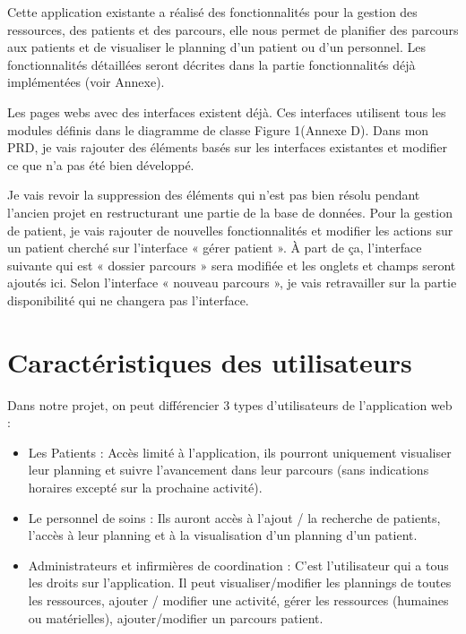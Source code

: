 \documentclass{polytech/polytech}
\begin{document}
Cette application existante a réalisé des fonctionnalités pour la gestion des ressources, des patients et des parcours, elle nous permet de planifier des parcours aux patients et de visualiser le planning d'un patient ou d'un personnel. Les fonctionnalités détaillées seront décrites dans la partie fonctionnalités déjà implémentées (voir Annexe).

Les pages webs avec des interfaces existent déjà. Ces interfaces utilisent tous les modules définis dans le diagramme de classe Figure 1(Annexe D). Dans mon PRD, je vais rajouter des éléments basés sur les interfaces existantes et modifier ce que n’a pas été bien développé. 

Je vais revoir la suppression des éléments qui n'est pas bien résolu pendant l'ancien projet en restructurant une partie de la base de données. Pour la gestion de patient, je vais rajouter de nouvelles fonctionnalités et modifier les actions sur un patient cherché sur l'interface « gérer patient ». À part de ça, l'interface suivante qui est « dossier parcours » sera modifiée et les onglets et champs seront ajoutés ici. Selon l'interface « nouveau parcours », je vais retravailler sur la partie disponibilité qui ne changera pas l'interface.


\section{Caractéristiques des utilisateurs}



Dans notre projet, on peut différencier 3 types d’utilisateurs de l’application web :

\begin{itemize}
	\item Les Patients : Accès limité à l'application, ils pourront uniquement visualiser leur planning et suivre l'avancement dans leur parcours (sans indications horaires excepté sur la prochaine activité).
	\item Le personnel de soins : Ils auront accès à l'ajout / la recherche de patients, l'accès à leur planning et à la visualisation d'un planning d'un patient.
	\item Administrateurs et infirmières de coordination : C'est l'utilisateur qui a tous les droits sur l'application. Il peut visualiser/modifier les plannings de toutes les ressources, ajouter / modifier une activité, gérer les ressources (humaines ou matérielles), ajouter/modifier un parcours patient.
\end{itemize}
\end{document}
